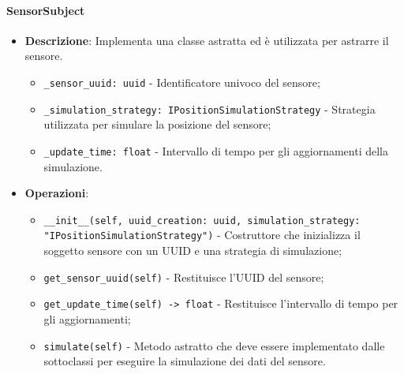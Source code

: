 \documentclass[10pt]{article}
\begin{document}
    \paragraph{SensorSubject}
    \begin{itemize} 
    \item \textbf{Descrizione}: Implementa una classe astratta ed è utilizzata per astrarre il sensore.
    \begin{itemize}
        \item \texttt{\_sensor\_uuid: uuid} - Identificatore univoco del sensore;
        \item \texttt{\_simulation\_strategy: IPositionSimulationStrategy} - Strategia utilizzata per simulare la posizione del sensore;
        \item \texttt{\_update\_time: float} - Intervallo di tempo per gli aggiornamenti della simulazione.
    \end{itemize}
    
    \item \textbf{Operazioni}:
    \begin{itemize}
        \item \texttt{\_\_init\_\_(self, uuid\_creation: uuid, simulation\_strategy: \\"IPositionSimulationStrategy")} - Costruttore che inizializza il soggetto sensore con un UUID e una strategia di simulazione;
        
        \item \texttt{get\_sensor\_uuid(self)} - Restituisce l'UUID del sensore;
        
        \item \texttt{get\_update\_time(self) -> float} - Restituisce l'intervallo di tempo per gli aggiornamenti;
        
        \item \texttt{simulate(self)} - Metodo astratto che deve essere implementato dalle sottoclassi per eseguire la simulazione dei dati del sensore.
    \end{itemize}
    \end{itemize}
\end{document}
